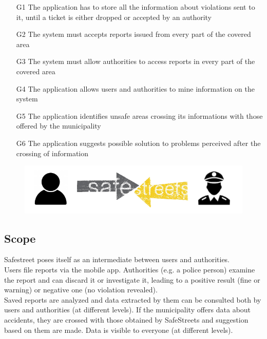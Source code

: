 \begin{itemize}
\item [G1]{The application has to store all the information about violations sent to it, until a ticket is either dropped or accepted by an authority}
\item [G2]{The system must accepts reports issued from every part of the covered area }
\item [G3]{The system must allow authorities to access reports in every part of the covered area}
\item [G4]{The application allows users and authorities to mine information on the system}
\item [G5]{The application identifies unsafe areas crossing its informations with those offered by the municipality}
\item [G6]{The application suggests possible solution to problems perceived after the crossing of information}
\end{itemize}

\begin{figure}
\includegraphics[width=\textwidth]{Images/Templates/icon-safestreets.PNG}
\end{figure}

\subsection{Scope}

Safestreet poses itself as an intermediate between users and authorities.\\
Users file reports via the mobile app. 
Authorities (e.g. a police person) examine the report and can discard it or investigate it, leading to a positive result (fine or warning) or negative one (no violation revealed).\\
Saved reports are analyzed and data extracted by them can be consulted both by users and authorities (at different levels).
If the municipality offers data about accidents, they are crossed with those obtained by SafeStreets and suggestion based on them are made. Data is visible to everyone (at different levels).

